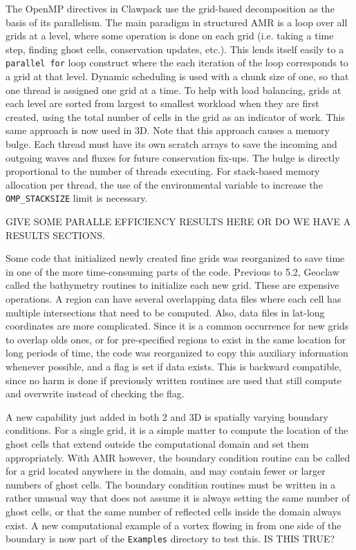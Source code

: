 The OpenMP directives in Clawpack use the 
grid-based decomposition as the basis of its
parallelism. The main paradigm in structured AMR is a loop over
all grids at a level, where some operation is done on each grid
(i.e. taking a time step, finding ghost cells, conservation
updates, etc.). This lends itself easily to a {\tt parallel for} loop
construct where the each iteration of the loop corresponds to a
grid at that level. Dynamic scheduling is used with a chunk size
of one, so that one thread is assigned one grid at a time. 
To help with load balancing, grids at
each level are sorted from largest to smallest workload when they
are first created, using
the total number of cells in the grid as an indicator of work.
This same approach is now used in 3D.  
Note that this approach causes a memory bulge. Each thread
must have its own scratch arrays to save the incoming and
outgoing waves and fluxes for future conservation fix-ups. 
The bulge is directly proportional to the number
of threads executing. For stack-based memory allocation per
thread, the use of the environmental variable to increase the
{\tt OMP\_STACKSIZE} limit is necessary.

GIVE SOME PARALLE EFFICIENCY RESULTS HERE
OR DO WE HAVE A RESULTS SECTIONS.

Some code that initialized newly
created fine grids was reorganized to save time in one of the
more time-consuming parts of the code.  Previous to 5.2, Geoclaw 
called the bathymetry routines to initialize each new grid.
These are expensive operations. A region can have several
overlapping  data files where each cell has multiple intersections 
that need to be computed. Also, data files in lat-long
coordinates are more complicated.  Since it is a common occurrence 
for new grids to overlap olds ones, or for pre-specified regions
to exist in the same location for long periods of time, the code
was reorganized to copy this auxiliary information whenever
possible, and a flag is set if data exists.
This is backward compatible, since no harm is done if previously
written routines are used that still compute and overwrite instead of
checking the flag.  

A new capability just added in both 2 and 3D is spatially varying
boundary conditions. For a single grid, it is a simple matter to
compute the location of the ghost cells that extend
outside the computational domain and set them appropriately.
With AMR however, the boundary condition routine can be called
for a grid located anywhere in the domain, and may contain fewer
or larger numbers of ghost cells. The boundary condition routines
must be written in a rather unusual way that does not assume it
is always setting the same number of ghost cells, or that the
same number of reflected cells inside the domain always exist.
A new computational
example of a vortex flowing in from one side of the boundary is
now part of the {\tt Examples} directory to test this. IS THIS
TRUE?



